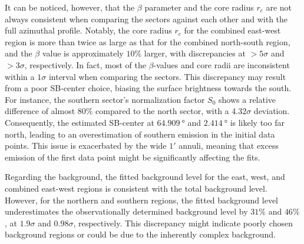 %
It can be noticed, however, that the \(\beta\) parameter and the core radius \(r_c\) are not always consistent when comparing the sectors against each other and with the full azimuthal profile. Notably, the core radius \(r_c\) for the combined east-west region is more than twice as large as that for the combined north-south region, and the \(\beta\) value is approximately \(10\%\) larger, with discrepancies at \(> 5\sigma\) and \(> 3\sigma\), respectively. In fact, most of the \(\beta\)-values and core radii are inconsistent within a \(1\sigma\) interval when comparing the sectors. This discrepancy may result from a poor SB-center choice, biasing the surface brightness towards the south. For instance, the southern sector's normalization factor \(S_0\) shows a relative difference of almost \(80\%\) compared to the north sector, with a \(4.32\sigma\) deviation. Consequently, the estimated SB-center at \(\SI{64.909}{\degree}\) and \(\SI{2.414}{\degree}\) is likely too far north, leading to an overestimation of southern emission in the initial data points. This issue is exacerbated by the wide \(1'\) annuli, meaning that excess emission of the first data
point might be significantly affecting the fits.

Regarding the background, the fitted background level for the east, west, and combined east-west regions is consistent with the total background level. However, for the northern and southern regions, the fitted background level underestimates the observationally determined background level by \(31\%\) and \(46\%\), at \(1.9\sigma\) and \(0.98\sigma\), respectively. This discrepancy might indicate poorly chosen background regions or could be due to the inherently complex background.
